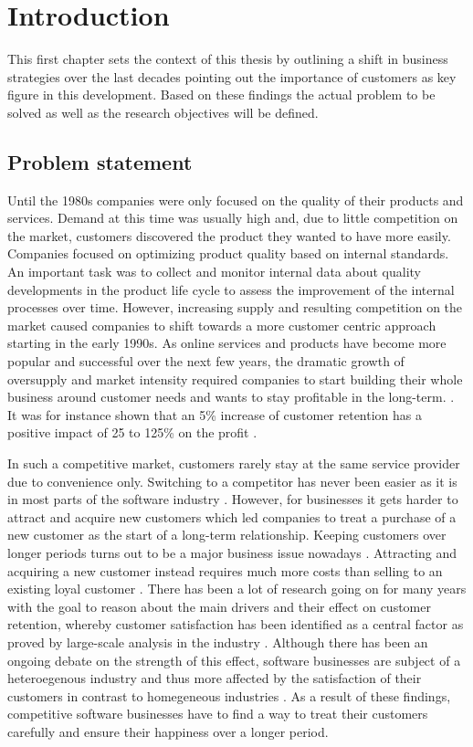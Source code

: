 \chapter{Introduction}
\label{ch:intro}
This first chapter sets the context of this thesis by outlining a shift in business strategies over the last decades pointing out the importance of customers as key figure in this development. Based on these findings the actual problem to be solved as well as the research objectives will be defined. 

\section{Problem statement}
\label{sec:problem}
Until the 1980s companies were only focused on the quality of their products and services. Demand at this time was usually high and, due to little competition on the market, customers discovered the product they wanted to have more easily. Companies focused on optimizing product quality based on internal standards. An important task was to collect and monitor internal data about quality developments in the product life cycle to assess the improvement of the internal processes over time. However, increasing supply and resulting competition on the market caused companies to shift towards a more customer centric approach starting in the early 1990s. As online services and products have become more popular and successful over the next few years, the dramatic growth of oversupply and market intensity required companies to start building their whole business around customer needs and wants to stay profitable in the long-term. \cite{neckel2015}. It was for instance shown that an 5\% increase of customer retention has a positive impact of 25 to 125\% on the profit \cite{bowen2001relationship}.

In such a competitive market, customers rarely stay at the same service provider due to convenience only. Switching to a competitor has never been easier as it is in most parts of the software industry \cite{rygielski2002data}. However, for businesses it gets harder to attract and acquire new customers which led companies to treat a purchase of a new customer as the start of a long-term relationship. Keeping customers over longer periods turns out to be a major business issue nowadays \cite{nerdinger2015} \cite{neckel2015}. Attracting and acquiring a new customer instead requires much more costs than selling to an existing loyal customer \cite{aydin2006switching}. There has been a lot of research going on for many years with the goal to reason about the main drivers and their effect on customer retention, whereby customer satisfaction has been identified as a central factor as proved by large-scale analysis in the industry \cite{fornell1992national} \cite{bolton1998dynamic} \cite{gustafsson2005effects}. Although there has been an ongoing debate on the strength of this effect, software businesses are subject of a heteroegenous industry and thus more affected by the satisfaction of their customers in contrast to homegeneous industries \cite{fornell1992national}. As a result of these findings, competitive software businesses have to find a way to treat their customers carefully and ensure their happiness over a longer period. 


